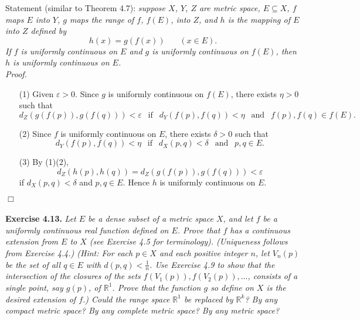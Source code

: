 \documentclass{article}
\begin{document}
Statement (similar to Theorem 4.7):
\emph{suppose $X$, $Y$, $Z$ are metric space, $E \subseteq X$,
$f$ maps $E$ into $Y$,
$g$ maps the range of $f$, $f(E)$, into $Z$,
and $h$ is the mapping of $E$ into $Z$ defined by
\[
  h(x) = g(f(x)) \:\:\:\:\:\:\:\: (x \in E).
\]
If $f$ is uniformly continuous on $E$ and
$g$ is uniformly continuous on $f(E)$,
then $h$ is uniformly continuous on $E$.} \\

\emph{Proof.}
\begin{enumerate}
\item[(1)]
Given $\varepsilon > 0$.
Since $g$ is uniformly continuous on $f(E)$,
there exists $\eta > 0$ such that
\[
  d_Z(g(f(p)),g(f(q))) < \varepsilon
  \:\:\text{ if }\:\: d_Y(f(p),f(q)) < \eta
  \:\:\text{ and }\:\: f(p), f(q) \in f(E).
\]

\item[(2)]
Since $f$ is uniformly continuous on $E$,
there exists $\delta > 0$ such that
\[
  d_Y(f(p),f(q)) < \eta
  \:\:\text{ if }\:\: d_X(p,q) < \delta
  \:\:\text{ and }\:\: p, q \in E.
\]

\item[(3)]
By (1)(2),
\[
  d_Z(h(p),h(q)) = d_Z(g(f(p)),g(f(q))) < \varepsilon
\]
if $d_X(p,q) < \delta$ and $p, q \in E$.
Hence $h$ is uniformly continuous on $E$.
\end{enumerate}
$\Box$ \\\\






\textbf{Exercise 4.13.}
\emph{Let $E$ be a dense subset of a metric space $X$,
and let $f$ be a uniformly continuous real function defined on $E$.
Prove that $f$ has a continuous extension from $E$ to $X$
(see Exercise 4.5 for terminology).
(Uniqueness follows from Exercise 4.4.)
(Hint:
For each $p \in X$ and each positive integer $n$,
let $V_n(p)$ be the set of all $q \in E$ with $d(p,q) < \frac{1}{n}$.
Use Exercise 4.9 to show that the intersection of the closures of the sets
$f(V_1(p)), f(V_2(p)), \ldots$,
consists of a single point, say $g(p)$, of $\mathbb{R}^1$.
Prove that the function $g$ so define on $X$ is the desired extension of $f$.)
Could the range space $\mathbb{R}^1$ be replaced by $\mathbb{R}^k$?
By any compact metric space?
By any complete metric space?
By any metric space?} \\
\end{document}
